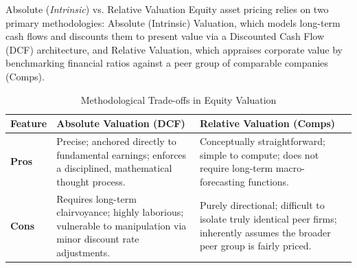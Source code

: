 \documentclass[10pt]{article}
\begin{document}
    \begin{core}{Absolute (\textit{Intrinsic}) vs. Relative Valuation}
      Equity asset pricing relies on two primary methodologies: Absolute (Intrinsic) Valuation, which models long-term cash flows and discounts them to present value via a Discounted Cash Flow (DCF) architecture, and Relative Valuation, which appraises corporate value by benchmarking financial ratios against a peer group of comparable companies (Comps).

      \begin{table}[H]
        \centering
        \small
        \begin{tabular}{l|p{5.5cm}|p{5.5cm}}
          \textbf{Feature} & \textbf{Absolute Valuation (DCF)} & \textbf{Relative Valuation (Comps)} \\ \hline
          \textbf{Pros} & Precise; anchored directly to fundamental earnings; enforces a disciplined, mathematical thought process. & Conceptually straightforward; simple to compute; does not require long-term macro-forecasting functions. \\ \hline
          \textbf{Cons} & Requires long-term clairvoyance; highly laborious; vulnerable to manipulation via minor discount rate adjustments. & Purely directional; difficult to isolate truly identical peer firms; inherently assumes the broader peer group is fairly priced.
        \end{tabular}
        \caption{Methodological Trade-offs in Equity Valuation}
        \label{tab:valuation_comparison}
      \end{table}
    \end{core}
\end{document}
